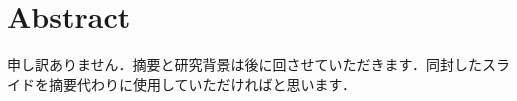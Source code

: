 \chapter*{Abstract}
\label{chapter:Abstract}
申し訳ありません．摘要と研究背景は後に回させていただきます．同封したスライドを摘要代わりに使用していただければと思います．

